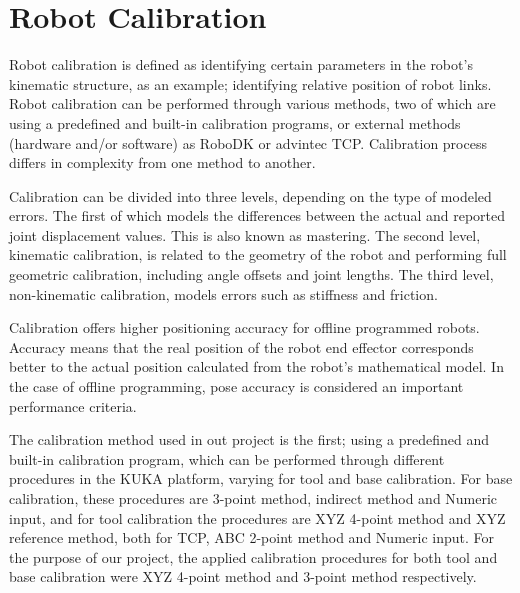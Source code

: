 	\newpage		
	\section{Robot Calibration}
	Robot calibration is defined as identifying certain parameters in the robot’s kinematic structure, as an example; identifying relative position of robot links. Robot calibration can be performed through various methods, two of which are using a predefined and built-in calibration programs, or external methods (hardware and/or software) as RoboDK or advintec TCP. Calibration process differs in complexity from one method to another. 

	Calibration can be divided into three levels, depending on the type of modeled errors. The first of which models the differences between the actual and reported joint displacement values. This is also known as mastering. The second level, kinematic calibration, is related to the geometry of the robot and performing full geometric calibration, including angle offsets and joint lengths. The third level, non-kinematic calibration, models errors such as stiffness and friction.

	Calibration offers higher positioning accuracy for offline programmed robots. Accuracy means that the real position of the robot end effector corresponds better to the actual position calculated from the robot’s mathematical model. In the case of offline programming, pose accuracy is considered an important performance criteria.
		
	The calibration method used in out project is the first; using a predefined and built-in calibration program, which can be performed through different procedures in the KUKA platform, varying for tool and base calibration. For base calibration, these procedures are 3-point method, indirect method and Numeric input, and for tool calibration the procedures are XYZ 4-point method and XYZ reference method, both for TCP, ABC 2-point method and Numeric input. For the purpose of our project, the applied calibration procedures for both tool and base calibration were XYZ 4-point method and 3-point method respectively.

